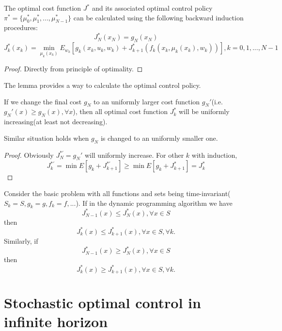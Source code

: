 \begin{refsection}
\begin{lemma}
The optimal cost function $J^*$ and its associated optimal control policy $\pi^* = \{\mu_0^*,\mu_1^*,...,\mu_{N-1}^*\}$ can be calculated using the following backward induction procedures:
$$J^*_N(x_N) = g_N(x_N)$$
$$J^*_k(x_k) = \min_{\mu_k(x_k)} E_{w_k}[g_k(x_k,u_k,w_k) + J^*_{k+1}(f_k(x_k,\mu_k(x_k),w_k))],k=0,1,...,N-1$$
\end{lemma}
\begin{proof}
Directly from principle of optimality.	
\end{proof}


\begin{remark}[interpretation]
The lemma provides a way to calculate the optimal control policy.
\end{remark}

\begin{lemma}
If we change the final cost $g_N$ to an uniformly larger cost function $g_N'$(i.e. $g_N'(x) \geq g_N(x),\forall x$), then all optimal cost function $J_k^*$ will be uniformly increasing(at least not decreasing).

Similar situation holds when $g_N$ is changed to an uniformly smaller one.
\end{lemma}
\begin{proof}
Obviously $J_N^{*'} = g_N'$ will uniformly increase. For other $k$ with induction, 
$$J_k^{*'} = \min E[g_k + J_{k+1}^{*'}] \geq \min E[g_k + J_{k+1}^*] = J^*_k$$
\end{proof}


\begin{lemma}\cite[60]{bertsekas2012dynamic}
Consider the basic problem with all functions and sets being time-invariant($S_k=S,g_k=g,f_k = f,...$).
If in the dynamic programming algorithm we have 
$$J_{N-1}^*(x) \leq J_N^*(x),\forall x\in S$$
then
$$J_{k}^*(x) \leq J_{k+1}^*(x), \forall x\in S, \forall k.$$
Similarly, if 
$$J_{N-1}^*(x) \geq J_N^*(x),\forall x\in S$$
then
$$J_{k}^*(x) \geq J_{k+1}^*(x), \forall x\in S, \forall k.$$
\end{lemma}



\section{Stochastic optimal control in infinite horizon}

\end{refsection}
